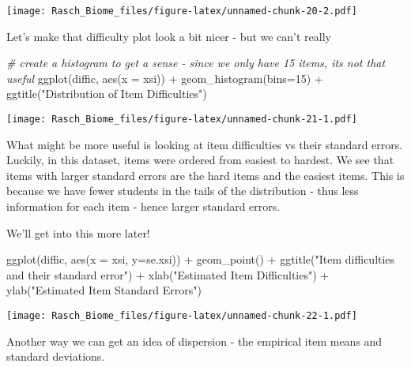\documentclass[
]{book}
\newenvironment{Shaded}{\begin{snugshade}}{\end{snugshade}}
\newcommand{\AttributeTok}[1]{\textcolor[rgb]{0.77,0.63,0.00}{#1}}
\newcommand{\CommentTok}[1]{\textcolor[rgb]{0.56,0.35,0.01}{\textit{#1}}}
\newcommand{\DecValTok}[1]{\textcolor[rgb]{0.00,0.00,0.81}{#1}}
\newcommand{\FunctionTok}[1]{\textcolor[rgb]{0.00,0.00,0.00}{#1}}
\newcommand{\NormalTok}[1]{#1}
\newcommand{\SpecialCharTok}[1]{\textcolor[rgb]{0.00,0.00,0.00}{#1}}
\newcommand{\StringTok}[1]{\textcolor[rgb]{0.31,0.60,0.02}{#1}}
\begin{document}
\texttt{[image: Rasch\_Biome\_files/figure-latex/unnamed-chunk-20-2.pdf]}

Let's make that difficulty plot look a bit nicer - but we can't really

\begin{Shaded}
\begin{Highlighting}[]
\CommentTok{\# create a histogram to get a sense {-} since we only have 15 items, it\textquotesingle{}s not that useful}
\FunctionTok{ggplot}\NormalTok{(diffic, }\FunctionTok{aes}\NormalTok{(}\AttributeTok{x =}\NormalTok{ xsi)) }\SpecialCharTok{+}
  \FunctionTok{geom\_histogram}\NormalTok{(}\AttributeTok{bins=}\DecValTok{15}\NormalTok{) }\SpecialCharTok{+}
  \FunctionTok{ggtitle}\NormalTok{(}\StringTok{"Distribution of Item Difficulties"}\NormalTok{)}
\end{Highlighting}
\end{Shaded}

\texttt{[image: Rasch\_Biome\_files/figure-latex/unnamed-chunk-21-1.pdf]}

What might be more useful is looking at item difficulties vs their standard errors. Luckily, in this dataset, items were ordered from easiest to hardest. We see that items with larger standard errors are the hard items and the easiest items. This is because we have fewer students in the tails of the distribution - thus less information for each item - hence larger standard errors.

We'll get into this more later!

\begin{Shaded}
\begin{Highlighting}[]
\FunctionTok{ggplot}\NormalTok{(diffic, }\FunctionTok{aes}\NormalTok{(}\AttributeTok{x =}\NormalTok{ xsi, }\AttributeTok{y=}\NormalTok{se.xsi)) }\SpecialCharTok{+} \FunctionTok{geom\_point}\NormalTok{() }\SpecialCharTok{+}
  \FunctionTok{ggtitle}\NormalTok{(}\StringTok{"Item difficulties and their standard error"}\NormalTok{) }\SpecialCharTok{+}
  \FunctionTok{xlab}\NormalTok{(}\StringTok{"Estimated Item Difficulties"}\NormalTok{) }\SpecialCharTok{+}
  \FunctionTok{ylab}\NormalTok{(}\StringTok{"Estimated Item Standard Errors"}\NormalTok{)}
\end{Highlighting}
\end{Shaded}

\texttt{[image: Rasch\_Biome\_files/figure-latex/unnamed-chunk-22-1.pdf]}

Another way we can get an idea of dispersion - the empirical item means and standard deviations.
\end{document}
